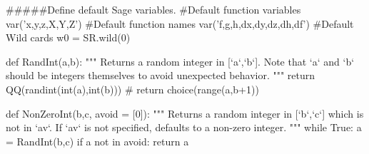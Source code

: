 \documentclass{ximera}
\begin{document}
\begin{sagesilent}
#####Define default Sage variables.
#Default function variables
var('x,y,z,X,Y,Z')
#Default function names
var('f,g,h,dx,dy,dz,dh,df')
#Default Wild cards
w0 = SR.wild(0)

def RandInt(a,b):
    """ Returns a random integer in [`a`,`b`]. Note that `a` and `b` should be integers themselves to avoid unexpected behavior.
    """
    return QQ(randint(int(a),int(b)))
    # return choice(range(a,b+1))

def NonZeroInt(b,c, avoid = [0]):
    """ Returns a random integer in [`b`,`c`] which is not in `av`. 
        If `av` is not specified, defaults to a non-zero integer.
    """
    while True:
        a = RandInt(b,c)
        if a not in avoid:
            return a

\end{sagesilent}
\end{document}
